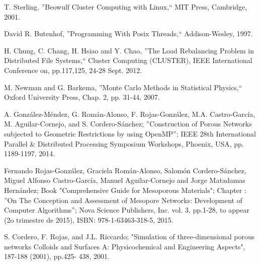 \begin{thebibliography}{9}
 T. Sterling. ''Beowulf Cluster Computing with Linux,`` MIT Press, Cambridge, 2001.

David R. Butenhof, ''Programming With Posix Threads,`` Addison-Wesley, 1997.

H. Chung, C. Chang, H. Hsiao and Y. Chao, ''The Load Rebalancing Problem in Distributed File Systems,`` Cluster Computing (CLUSTER), IEEE International Conference on, pp.117,125, 24-28 Sept. 2012.

M. Newman and G. Barkema, ''Monte Carlo Methods in Statistical Physics,`` Oxford University Press, Chap. 2, pp. 31-44, 2007.

A. Gonz\'alez-M\'endez, G. Rom\'an-Alonso, F. Rojas-Gonz\'alez, M.A. Castro-Garc\'ia, M. Aguilar-Cornejo, and S. Cordero-S\'anchez;
''Construction of Porous Networks subjected to Geometric Restrictions by using OpenMP''; IEEE 28th
International Parallel \& Distributed Processing Symposium Workshops, Phoenix, USA, pp. 1189-1197, 2014.


Fernando Rojas-Gonz\'alez, Graciela Rom\'an-Alonso, Salom\'on Cordero-S\'anchez, Miguel Alfonso Castro-Garc\'ia, Manuel Aguilar-Cornejo and Jorge Matadamas Hern\'andez; Book "Comprehensive Guide for Mesoporous Materials"; Chapter : ''On The Conception and Assessment of Mesopore Networks: Development of Computer Algorithms''; Nova Science Publishers, Inc. vol. 3, pp.1-28, to appear (2o trimestre de 2015), ISBN: 978-1-63463-318-5, 2015.

S. Cordero, F. Rojas, and J.L. Riccardo; "Simulation of three-dimensional porous networks Colloids and Surfaces A: Physicochemical and Engineering Aspects", 187-188 (2001), pp.425- 438, 2001.



\end{thebibliography}
